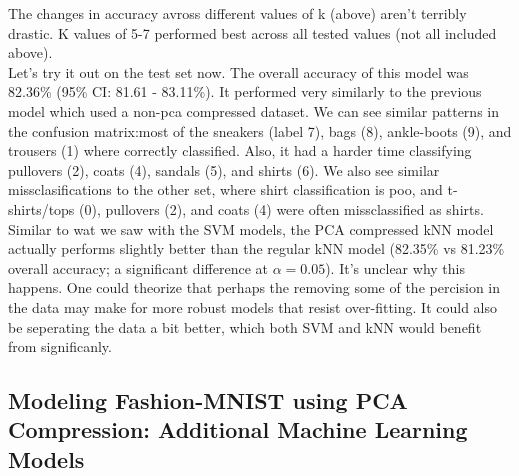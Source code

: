\documentclass{article}
\begin{document}
The changes in accuracy avross different values of k (above) aren't
terribly drastic. K values of 5-7 performed best across all tested
values (not all included above).\\
Let's try it out on the test set now. The overall accuracy of this model
was 82.36\% (95\% CI: 81.61 - 83.11\%). It performed very similarly to
the previous model which used a non-pca compressed dataset. We can see
similar patterns in the confusion matrix:most of the sneakers (label 7),
bags (8), ankle-boots (9), and trousers (1) where correctly classified.
Also, it had a harder time classifying pullovers (2), coats (4), sandals
(5), and shirts (6). We also see similar missclasifications to the other
set, where shirt classification is poo, and t-shirts/tops (0), pullovers
(2), and coats (4) were often missclassified as shirts. Similar to wat
we saw with the SVM models, the PCA compressed kNN model actually
performs slightly better than the regular kNN model (82.35\% vs 81.23\%
overall accuracy; a significant difference at \(\alpha = 0.05\)). It's
unclear why this happens. One could theorize that perhaps the removing
some of the percision in the data may make for more robust models that
resist over-fitting. It could also be seperating the data a bit better,
which both SVM and kNN would benefit from significanly.

\hypertarget{modeling-fashion-mnist-using-pca-compression-additional-machine-learning-models}{%
\subsection{Modeling Fashion-MNIST using PCA Compression: Additional
Machine Learning
Models}\label{modeling-fashion-mnist-using-pca-compression-additional-machine-learning-models}}
\end{document}
